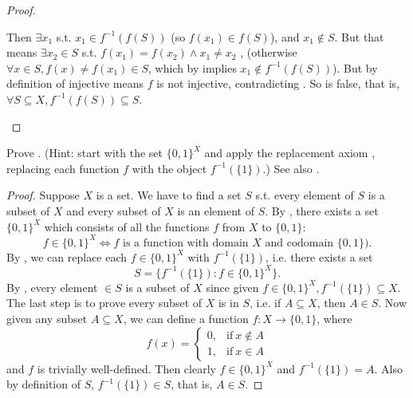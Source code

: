 \begin{proof}
\begin{itemize}
\begin{itemize}
                Then \(\exists x_1\) s.t. \(x_1 \in f^{-1}(f(S))\) (so \(f(x_1) \in f(S)\)), and \(x_1 \notin S\).
                But that means \(\exists x_2 \in S\) s.t. \(f(x_1) = f(x_2) \land x_1 \neq x_2\) ,
                (otherwise \(\forall x \in S, f(x) \neq f(x_1) \in S\),
                which by  implies \(x_1 \notin f^{-1}(f(S))\)).
                But  by definition of injective means \(f\) is not injective, contradicting .
                So  is false,
                that is, \(\forall S \subseteq X, f^{-1}(f(S)) \subseteq S\).
        \end{itemize}
\end{itemize}
\end{proof}

\begin{exercise} \label{exercise 3.4.6}
Prove .
(Hint: start with the set \(\{0, 1\}^X\) and apply the replacement axiom , replacing each function \(f\) with the object \(f^{-1}( \{1\} )\).)
See also .
\end{exercise}

\begin{proof}
Suppose \(X\) is a set. We have to find a set \(S\) s.t. every element of \(S\) is a subset of \(X\) and every subset of \(X\) is an element of \(S\).
By , there exists a set \(\{0, 1\}^X\) which consists of all the functions \(f\) from \(X\) to \(\{0, 1\}\):
\[
    f \in \{0, 1\}^X \iff \text{\(f\) is a function with domain \(X\) and codomain \(\{0, 1\}\)}).
\]
By , we can replace each \(f \in \{0, 1\}^X\) with \(f^{-1}(\{ 1 \})\), i.e. there exists a set
\[
    S = \{ f^{-1}(\{ 1 \}) : f \in \{ 0, 1 \}^X \}.
\]
By , every element \(\in S\) is a subset of \(X\) since given \(f \in \{0, 1\}^X, f^{-1}(\{ 1 \}) \subseteq X\).
The last step is to prove every subset of \(X\) is in \(S\), i.e. if \(A \subseteq X\), then \(A \in S\).
Now given any subset \(A \subseteq X\), we can define a function \(f : X \rightarrow \{0, 1\}\), where
    \begin{equation*}
        f(x) =
        \begin{cases}
          0, & \text{if}\ x \notin A \\
          1, & \text{if}\ x \in A
        \end{cases}
    \end{equation*}
and \(f\) is trivially well-defined.
Then clearly \(f \in \{0, 1\}^X\) and \(f^{-1}(\{ 1 \}) = A\).
Also by definition of \(S\), \(f^{-1}(\{ 1 \}) \in S\), that is, \(A \in S\).
\end{proof}

